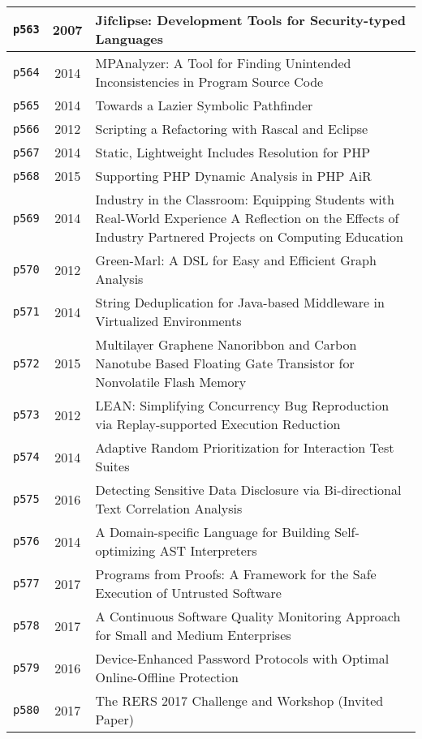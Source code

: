 \begin{longtable}{| c | c | p{16cm} |}
  \hline
  \texttt{p563} & 2007 & Jifclipse: Development Tools for Security-typed Languages \\
  \hline
  \texttt{p564} & 2014 & MPAnalyzer: A Tool for Finding Unintended Inconsistencies in Program Source Code \\
  \hline
  \texttt{p565} & 2014 & Towards a Lazier Symbolic Pathfinder \\
  \hline
  \texttt{p566} & 2012 & Scripting a Refactoring with Rascal and Eclipse \\
  \hline
  \texttt{p567} & 2014 & Static, Lightweight Includes Resolution for PHP \\
  \hline
  \texttt{p568} & 2015 & Supporting PHP Dynamic Analysis in PHP AiR \\
  \hline
  \texttt{p569} & 2014 & Industry in the Classroom: Equipping Students with Real-World Experience A Reflection on the Effects of Industry Partnered Projects on Computing Education \\
  \hline
  \texttt{p570} & 2012 & Green-Marl: A DSL for Easy and Efficient Graph Analysis \\
  \hline
  \texttt{p571} & 2014 & String Deduplication for Java-based Middleware in Virtualized Environments \\
  \hline
  \texttt{p572} & 2015 & Multilayer Graphene Nanoribbon and Carbon Nanotube Based Floating Gate Transistor for Nonvolatile Flash Memory \\
  \hline
  \texttt{p573} & 2012 & LEAN: Simplifying Concurrency Bug Reproduction via Replay-supported Execution Reduction \\
  \hline
  \texttt{p574} & 2014 & Adaptive Random Prioritization for Interaction Test Suites \\
  \hline
  \texttt{p575} & 2016 & Detecting Sensitive Data Disclosure via Bi-directional Text Correlation Analysis \\
  \hline
  \texttt{p576} & 2014 & A Domain-specific Language for Building Self-optimizing AST Interpreters \\
  \hline
  \texttt{p577} & 2017 & Programs from Proofs: A Framework for the Safe Execution of Untrusted Software \\
  \hline
  \texttt{p578} & 2017 & A Continuous Software Quality Monitoring Approach for Small and Medium Enterprises \\
  \hline
  \texttt{p579} & 2016 & Device-Enhanced Password Protocols with Optimal Online-Offline Protection \\
  \hline
  \texttt{p580} & 2017 & The RERS 2017 Challenge and Workshop (Invited Paper) \\

\end{longtable}
